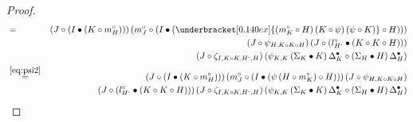 \documentclass[nosumlimits,twoside]{amsart}
\theoremstyle{definition}
\theoremstyle{remark}
\def\revsn{\text{-}}
\begin{document}
\begin{proof}
\begin{eqnarray*}
&=&
\left( J\circ \left( I\bullet \left( K\circ m_{H}^{\circ }\right) \right)
\right) \left( m_{J}^{\circ }\circ \left( I\bullet \left( \underbracket[0.140ex]{\left(
m_{K}^{\circ }\circ H\right) \left( K\circ \psi \right) \left( \psi \circ
K\right) }\circ H\right) \right) \right)  \\
 &&\left( J\circ \psi _{H,K\circ K\circ H}\right)
\left( J\circ \left( l_{H^{\revsn}}^{\circ }\bullet \left( K\circ K\circ
H\right) \right) \right)  \\
&&\left( J\circ \zeta _{I,K\circ K,H^{\revsn},H}\right) \left( \psi
_{K,K}\left( \Sigma _{K}\bullet K\right) \Delta _{K}^{\bullet }\circ \left(
\Sigma _{H}\bullet H\right) \Delta _{H}^{\bullet }\right)\\
&\overset{\eqref{eq:psi2}}{=}&
\left( J\circ \left( I\bullet \left( K\circ m_{H}^{\circ }\right) \right)
\right) \left( m_{J}^{\circ }\circ \left( I\bullet \left( \psi \left( H\circ m_{K}^{\circ
}\right) \circ H\right) \right) \right)  \left( J\circ \psi _{H,K\circ K\circ H}\right) \\
 &&\left( J\circ \left( l_{H^{%
\revsn}}^{\circ }\bullet \left( K\circ K\circ H\right) \right) \right)
\left( J\circ \zeta _{I,K\circ K,H^{\revsn},H}\right)  
\left( \psi _{K,K}\left( \Sigma _{K}\bullet K\right) \Delta _{K}^{\bullet
}\circ \left( \Sigma _{H}\bullet H\right) \Delta _{H}^{\bullet }\right)\\

\end{eqnarray*}
\end{proof}
\end{document}
